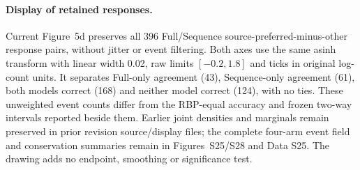 \paragraph{Display of retained responses.} Current Figure~5d preserves all 396 Full/Sequence source-preferred-minus-other response pairs, without jitter or event filtering. Both axes use the same asinh transform with linear width 0.02, raw limits $[-0.2,1.8]$ and ticks in original log-count units. It separates Full-only agreement (43), Sequence-only agreement (61), both models correct (168) and neither model correct (124), with no ties. These unweighted event counts differ from the RBP-equal accuracy and frozen two-way intervals reported beside them. Earlier joint densities and marginals remain preserved in prior revision source/display files; the complete four-arm event field and conservation summaries remain in Figures~S25/S28 and Data S25. The drawing adds no endpoint, smoothing or significance test.
